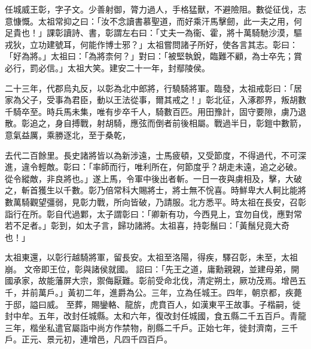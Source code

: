\begin{pinyinscope}
 
 
 任城威王彰，字子文。少善射御，膂力過人，手格猛獸，不避險阻。數從征伐，志意慷慨。太祖常抑之曰：「汝不念讀書慕聖道，而好乘汗馬擊劒，此一夫之用，何足貴也！」課彰讀詩、書，彰謂左右曰：「丈夫一為衞、霍，將十萬騎馳沙漠，驅戎狄，立功建號耳，何能作博士邪？」太祖嘗問諸子所好，使各言其志。彰曰：「好為將。」太祖曰：「為將柰何？」對曰：「被堅執銳，臨難不顧，為士卒先；賞必行，罰必信。」太祖大笑。建安二十一年，封鄢陵侯。
 
 
 
 
 二十三年，代郡烏丸反，以彰為北中郎將，行驍騎將軍。臨發，太祖戒彰曰：「居家為父子，受事為君臣，動以王法從事，爾其戒之！」彰北征，入涿郡界，叛胡數千騎卒至。時兵馬未集，唯有步卒千人，騎數百匹。用田豫計，固守要隙，虜乃退散。彰追之，身自搏戰，射胡騎，應弦而倒者前後相屬。戰過半日，彰鎧中數箭，意氣益厲，乘勝逐北，至于桑乾，
 
 
 去代二百餘里。長史諸將皆以為新涉遠，士馬疲頓，又受節度，不得過代，不可深進，違令輕敵。彰曰：「率師而行，唯利所在，何節度乎？胡走未遠，追之必破。從令縱敵，非良將也。」遂上馬，令軍中後出者斬。一日一夜與虜相及，擊，大破之，斬首獲生以千數。彰乃倍常科大賜將士，將士無不恱喜。時鮮卑大人軻比能將數萬騎觀望彊弱，見彰力戰，所向皆破，乃請服。北方悉平。時太祖在長安，召彰詣行在所。彰自代過鄴，太子謂彰曰：「卿新有功，今西見上，宜勿自伐，應對常若不足者。」彰到，如太子言，歸功諸將。太祖喜，持彰鬚曰：「黃鬚兒竟大奇也！」
 
 
太祖東還，以彰行越騎將軍，留長安。太祖至洛陽，得疾，驛召彰，未至，太祖崩。
 文帝即王位，彰與諸侯就國。
 詔曰：「先王之道，庸勳親親，並建母弟，開國承家，故能藩屏大宗，禦侮厭難。彰前受命北伐，清定朔土，厥功茂焉。增邑五千，并前萬戶。」黃初二年，進爵為公。三年，立為任城王。四年，朝京都，疾薨于邸，謚曰威。
 至葬，賜鑾輅、龍旂，虎賁百人，如漢東平王故事。子楷嗣，徙封中牟。五年，改封任城縣。太和六年，復改封任城國，食五縣二千五百戶。青龍三年，楷坐私遣官屬詣中尚方作禁物，削縣二千戶。正始七年，徙封濟南，三千戶。正元、景元初，連增邑，凡四千四百戶。
 
 
\end{pinyinscope}